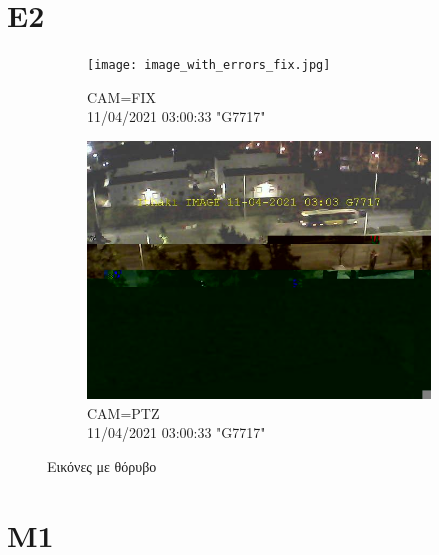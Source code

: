 \documentclass[hidelinks, 12pt, a4paper]{article}
\begin{document}
\section{E2}

\begin{figure}[h!]
     \begin{subfigure}[b]{0.5\textwidth}
         \centering
         \texttt{[image: image\_with\_errors\_fix.jpg]}
         \caption{CAM=FIX \\ 11/04/2021 03:00:33 "G7717"}
     \end{subfigure}
     \hfill
     \begin{subfigure}[b]{0.5\textwidth}
         \centering
         \includegraphics[keepaspectratio, width=\textwidth]{image_with_errors_ptz.jpg}
         \caption{CAM=PTZ \\ 11/04/2021 03:00:33 "G7717"}
     \end{subfigure}
     \caption{Εικόνες με θόρυβο}
\end{figure}

\pagebreak

\section{M1}
\end{document}
